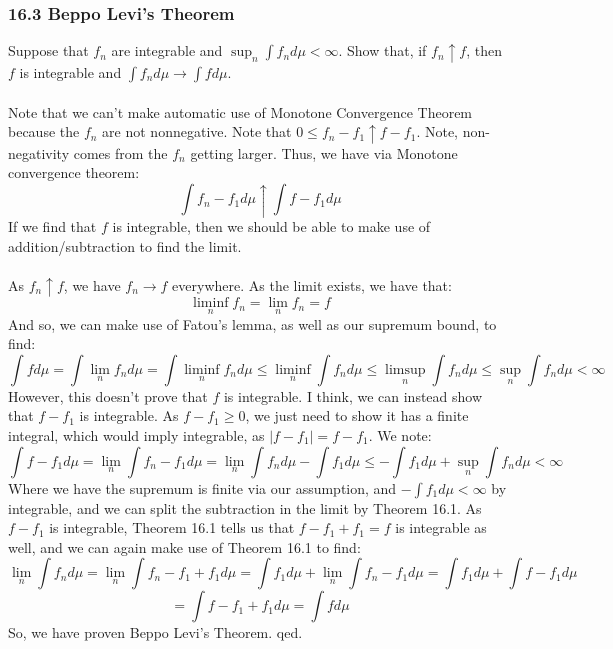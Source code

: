 \documentclass[12pt,a4paper]{article}
\newcommand{\1}[1]{\mathbbm{1}\left\{ #1 \right\}}
\begin{document}
\subsubsection{16.3 Beppo Levi's Theorem} Suppose that $f_n$ are integrable and $\sup_n \int f_n d\mu < \infty$. Show that, if $f_n \uparrow f$, then $f$ is integrable and $\int f_n d\mu \to \int f d\mu$.
\\\\
Note that we can't make automatic use of Monotone Convergence Theorem because the $f_n$ are not nonnegative. Note that $0 \leq f_n - f_1 \uparrow f - f_1$. Note, non-negativity comes from the $f_n$ getting larger. Thus, we have via Monotone convergence theorem:
$$
	\int f_n - f_1 d\mu \uparrow \int f - f_1 d\mu
$$
If we find that $f$ is integrable, then we should be able to make use of addition/subtraction to find the limit. 
\\\\
As $f_n \uparrow f$, we have $f_n \to f$ everywhere. As the limit exists, we have that:
$$
	\liminf_n f_n = \lim_n f_n = f
$$
And so, we can make use of Fatou's lemma, as well as our supremum bound, to find:
$$
	\int f d\mu = \int \lim_n f_n d\mu = \int \liminf_n f_n d\mu \leq
	\liminf_n \int f_n d\mu \leq \limsup_n \int f_n d\mu \leq \sup_n \int f_n d\mu < \infty
$$
However, this doesn't prove that $f$ is integrable. I think, we can instead show that $f - f_1$ is integrable. As $f - f_1 \geq 0$, we just need to show it has a finite integral, which would imply integrable, as $|f - f_1| = f - f_1$. We note:
$$
	\int f - f_1 d\mu = \lim_n \int f_n - f_1 d\mu =
	\lim_n \int f_n d\mu - \int f_1 d\mu \leq
	- \int f_1 d\mu + \sup_n \int f_n d\mu < \infty
$$
Where we have the supremum is finite via our assumption, and $-\int f_1 d\mu < \infty$ by integrable, and we can split the subtraction in the limit by Theorem 16.1. As $f - f_1$ is integrable, Theorem 16.1 tells us that $f - f_1 + f_1 = f$ is integrable as well, and we can again make use of Theorem 16.1 to find:
$$
	\lim_n \int f_n d\mu =
	\lim_n \int f_n - f_1 + f_1 d\mu =
	\int f_1 d\mu + \lim_n \int f_n - f_1 d\mu =
	\int f_1 d\mu + \int f - f_1 d\mu 
$$
$$
	= \int f - f_1 + f_1 d\mu = \int f d\mu
$$
So, we have proven Beppo Levi's Theorem. qed.
\end{document}
